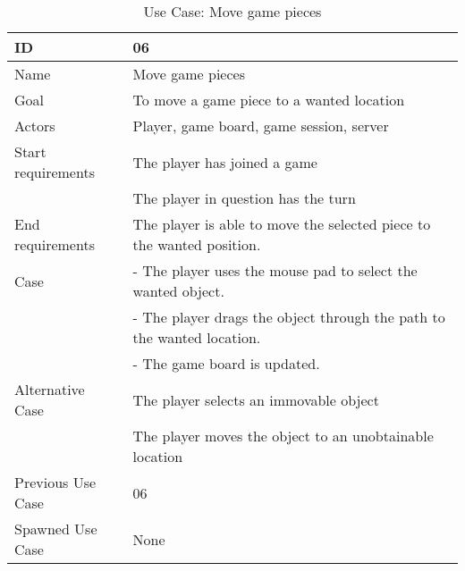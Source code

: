 \begin{table}[H]
\begin{tabular}{|l|l|}
\hline
	\textbf{ID} & \textbf{06}\\ \hline
	Name & Move game pieces \\ \hline
	Goal & To move a game piece to a wanted location \\ \hline
	Actors & Player, game board, game session, server \\ \hline
	Start requirements & The player has joined a game \\
				& The player in question has the turn \\ \hline
	End requirements & The player is able to move the selected piece to the wanted position. \\ \hline
	Case &- The player uses the mouse pad to select the wanted object. \\
		&- The player drags the object through the path to the wanted location. \\
		&- The game board is updated. \\ \hline
	Alternative Case & The player selects an immovable object \\
				& The player moves the object to an unobtainable location\\ \hline
	Previous Use Case & 06 \\ \hline
	Spawned Use Case & None\\ \hline
\end{tabular}
\caption{Use Case: Move game pieces}
\label{fig:usecase06table}
\end{table}

